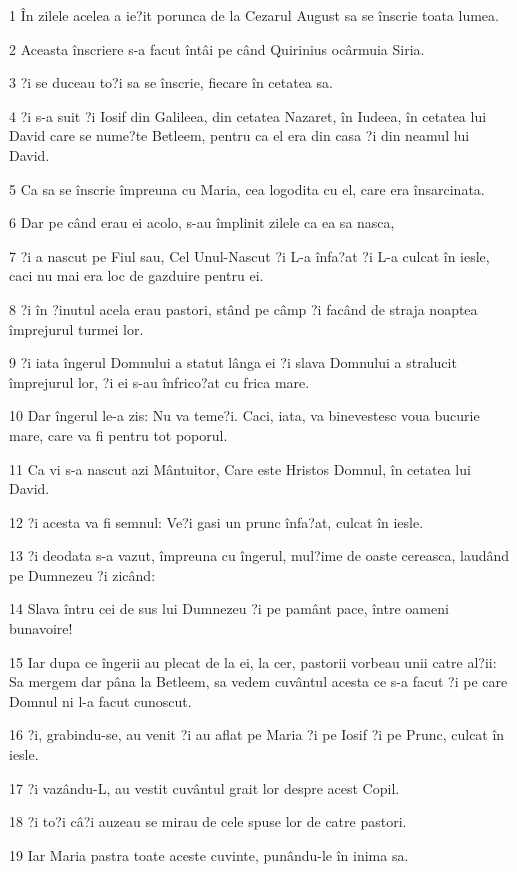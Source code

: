 \par 1 În zilele acelea a ie?it porunca de la Cezarul August sa se înscrie toata lumea.
\par 2 Aceasta înscriere s-a facut întâi pe când Quirinius ocârmuia Siria.
\par 3 ?i se duceau to?i sa se înscrie, fiecare în cetatea sa.
\par 4 ?i s-a suit ?i Iosif din Galileea, din cetatea Nazaret, în Iudeea, în cetatea lui David care se nume?te Betleem, pentru ca el era din casa ?i din neamul lui David.
\par 5 Ca sa se înscrie împreuna cu Maria, cea logodita cu el, care era însarcinata.
\par 6 Dar pe când erau ei acolo, s-au împlinit zilele ca ea sa nasca,
\par 7 ?i a nascut pe Fiul sau, Cel Unul-Nascut ?i L-a înfa?at ?i L-a culcat în iesle, caci nu mai era loc de gazduire pentru ei.
\par 8 ?i în ?inutul acela erau pastori, stând pe câmp ?i facând de straja noaptea împrejurul turmei lor.
\par 9 ?i iata îngerul Domnului a statut lânga ei ?i slava Domnului a stralucit împrejurul lor, ?i ei s-au înfrico?at cu frica mare.
\par 10 Dar îngerul le-a zis: Nu va teme?i. Caci, iata, va binevestesc voua bucurie mare, care va fi pentru tot poporul.
\par 11 Ca vi s-a nascut azi Mântuitor, Care este Hristos Domnul, în cetatea lui David.
\par 12 ?i acesta va fi semnul: Ve?i gasi un prunc înfa?at, culcat în iesle.
\par 13 ?i deodata s-a vazut, împreuna cu îngerul, mul?ime de oaste cereasca, laudând pe Dumnezeu ?i zicând:
\par 14 Slava întru cei de sus lui Dumnezeu ?i pe pamânt pace, între oameni bunavoire!
\par 15 Iar dupa ce îngerii au plecat de la ei, la cer, pastorii vorbeau unii catre al?ii: Sa mergem dar pâna la Betleem, sa vedem cuvântul acesta ce s-a facut ?i pe care Domnul ni l-a facut cunoscut.
\par 16 ?i, grabindu-se, au venit ?i au aflat pe Maria ?i pe Iosif ?i pe Prunc, culcat în iesle.
\par 17 ?i vazându-L, au vestit cuvântul grait lor despre acest Copil.
\par 18 ?i to?i câ?i auzeau se mirau de cele spuse lor de catre pastori.
\par 19 Iar Maria pastra toate aceste cuvinte, punându-le în inima sa.
